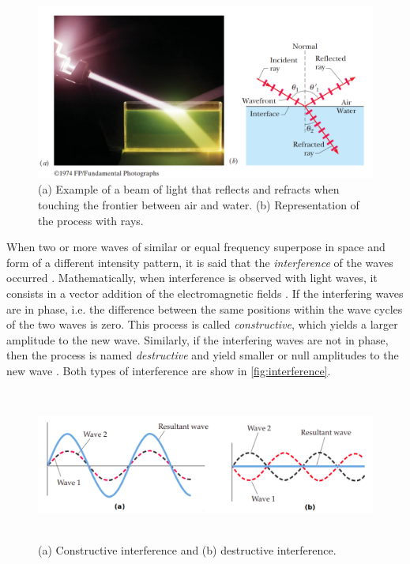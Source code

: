 \begin{figure}[htb]
	\centering
	\caption{\label{fig:beam_split} 
	    (a) Example of a beam of light that reflects and refracts when touching the frontier between air and water. (b) Representation of the process with rays.}
	\begin{center}
	    \includegraphics[scale=0.3]{images/fig3.png}
	\end{center}
	\centering
\end{figure}

When two or more waves of similar or equal frequency superpose in space and form of a different intensity pattern, it is said that the \emph{interference} of the waves occurred \cite{tipler2008physics}. Mathematically, when interference is observed with light waves, it consists in a vector addition of the electromagnetic fields \cite{zilio2009optica}.
If the interfering waves are in phase, i.e. the difference between the same positions within the wave cycles of the two waves is zero. This process is called \emph{constructive}, which yields a larger amplitude to the new wave. Similarly, if the interfering waves are not in phase, then the process is named \emph{destructive} and yield smaller or null amplitudes to the new wave \cite{tipler2007physics}. Both types of interference are show in \autoref{fig:interference}.

\begin{figure}[htb]
	\centering
	\caption{\label{fig:interference} 
	    (a) Constructive interference and (b) destructive interference.}
	\begin{center}
	    \includegraphics[width=\textwidth,height=5cm]{images/interference.png}
	\end{center}
	\centering
\end{figure}


